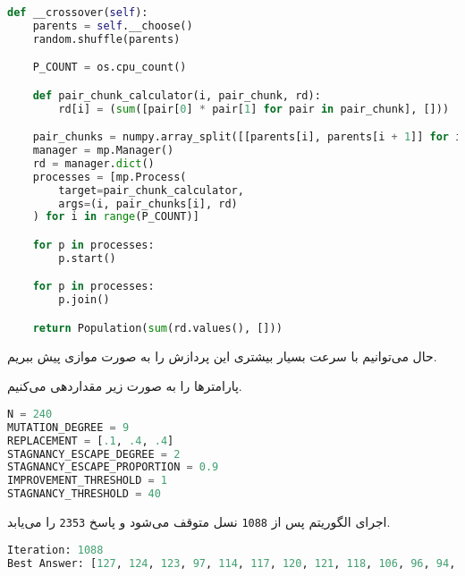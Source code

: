 \documentclass[a4paper, 12pt]{article}
\theoremstyle{definition}
\begin{document}
\LTR
\begin{lstlisting}[language=Python]
def __crossover(self):
    parents = self.__choose()
    random.shuffle(parents)

    P_COUNT = os.cpu_count()

    def pair_chunk_calculator(i, pair_chunk, rd):
        rd[i] = (sum([pair[0] * pair[1] for pair in pair_chunk], []))

    pair_chunks = numpy.array_split([[parents[i], parents[i + 1]] for i in range(0, len(parents) - 1, 2)], P_COUNT)
    manager = mp.Manager()
    rd = manager.dict()
    processes = [mp.Process(
        target=pair_chunk_calculator,
        args=(i, pair_chunks[i], rd)
    ) for i in range(P_COUNT)]

    for p in processes:
        p.start()

    for p in processes:
        p.join()

    return Population(sum(rd.values(), []))
\end{lstlisting}
\RTL

حال می‌توانیم با سرعت بسیار بیشتری این پردازش را به صورت موازی پیش ببریم.


پارامترها را به صورت زیر مقداردهی می‌کنیم.

\LTR
\begin{lstlisting}[language=Python]
N = 240
MUTATION_DEGREE = 9
REPLACEMENT = [.1, .4, .4]
STAGNANCY_ESCAPE_DEGREE = 2
STAGNANCY_ESCAPE_PROPORTION = 0.9
IMPROVEMENT_THRESHOLD = 1
STAGNANCY_THRESHOLD = 40
\end{lstlisting}
\RTL

اجرای الگوریتم پس از
\texttt{1088}
نسل متوقف می‌شود و پاسخ
\texttt{2353}
را می‌یابد.

\LTR
\begin{lstlisting}[language=Python]
Iteration: 1088
Best Answer: [127, 124, 123, 97, 114, 117, 120, 121, 118, 106, 96, 94, 95, 98, 73, 89, 88, 87, 86, 80, 78, 76, 72, 71, 70, 69, 57, 15, 16, 11, 1, 25, 21, 12, 0, 2, 3, 4, 5, 9, 52, 50, 223, 224, 217, 216, 226, 225, 227, 228, 51, 58, 53, 54, 56, 82, 83, 81, 105, 111, 93, 102, 101, 100, 99, 92, 91, 24, 19, 18, 10, 8, 6, 7, 17, 55, 22, 23, 84, 85, 79, 62, 64, 65, 63, 61, 59, 60, 66, 67, 68, 77, 75, 74, 90, 34, 32, 33, 103, 107, 109, 113, 128, 119, 115, 112, 125, 130, 168, 166, 167, 176, 178, 39, 38, 40, 180, 185, 184, 182, 162, 134, 135, 136, 137, 138, 152, 153, 154, 148, 147, 146, 145, 151, 150, 149, 204, 210, 202, 157, 200, 156, 144, 143, 142, 140, 139, 141, 122, 116, 126, 129, 131, 110, 108, 104, 36, 35, 20, 14, 13, 26, 27, 30, 29, 28, 31, 37, 165, 132, 133, 161, 177, 183, 46, 44, 189, 188, 187, 193, 191, 198, 172, 171, 163, 160, 159, 155, 158, 203, 211, 205, 206, 219, 209, 208, 207, 215, 214, 213, 212, 218, 220, 222, 221, 201, 199, 194, 195, 186, 49, 47, 45, 41, 42, 43, 48, 190, 192, 196, 197, 164, 175, 174, 173, 181, 179, 169, 170]: 2353
\end{lstlisting}
\RTL
\end{document}
